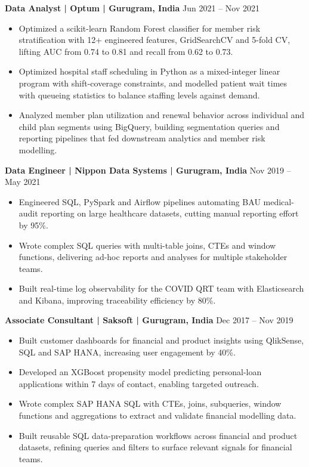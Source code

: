 \documentclass[10pt,a4paper]{article}
\newcommand{\role}[2]{\textbf{#1} \hfill #2\par}
\begin{document}
\role{Data Analyst | Optum | Gurugram, India}{Jun 2021 -- Nov 2021}
\begin{itemize}\sloppy
  \item Optimized a scikit-learn Random Forest classifier for member risk stratification with 12+ engineered features,
  GridSearchCV and 5-fold CV, lifting AUC from 0.74 to 0.81 and recall from 0.62 to 0.73.
  \item Optimized hospital staff scheduling in Python as a mixed-integer linear program with shift-coverage
  constraints, and modelled patient wait times with queueing statistics to balance staffing levels against demand.
  \item Analyzed member plan utilization and renewal behavior across individual and child plan segments using
  BigQuery, building segmentation queries and reporting pipelines that fed downstream analytics and member risk
  modelling.
\end{itemize}
\vspace{3pt}

\role{Data Engineer | Nippon Data Systems | Gurugram, India}{Nov 2019 -- May 2021}
\begin{itemize}
  \item Engineered SQL, PySpark and Airflow pipelines automating BAU medical-audit reporting on large healthcare datasets,
  cutting manual reporting effort by 95\%.
  \item Wrote complex SQL queries with multi-table joins, CTEs and window functions, delivering ad-hoc reports and
  analyses for multiple stakeholder teams.
  \item Built real-time log observability for the COVID QRT team with Elasticsearch and Kibana, improving traceability
  efficiency by 80\%.
\end{itemize}
\vspace{3pt}

\role{Associate Consultant | Saksoft | Gurugram, India}{Dec 2017 -- Nov 2019}
\begin{itemize}
  \item Built customer dashboards for financial and product insights using QlikSense, SQL and SAP HANA, increasing user engagement by 40\%.
  \item Developed an XGBoost propensity model predicting personal-loan applications within 7 days of contact, enabling targeted outreach.
  \item Wrote complex SAP HANA SQL with CTEs, joins, subqueries, window functions and aggregations to extract and
  validate financial modelling data.
  \item Built reusable SQL data-preparation workflows across financial and product datasets, refining queries and filters
  to surface relevant signals for financial teams.
\end{itemize}
\end{document}
